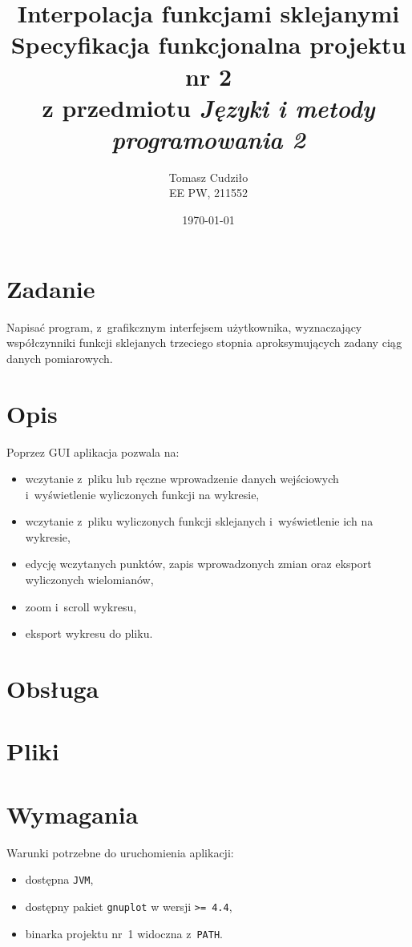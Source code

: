 \documentclass[10pt,a4paper]{article}
\newcommand{\prog}[1]{\texttt{#1}}
\begin{document}
\title{ 
  Interpolacja funkcjami sklejanymi\\
  {\normalsize Specyfikacja funkcjonalna projektu nr 2}\\\vspace{-12pt}
  {\normalsize z przedmiotu \emph{Języki i metody programowania 2}}
}
\author{
  Tomasz Cudziło\\
  {\small EE PW, 211552}
}
\date{\today}
\maketitle

\section*{Zadanie}
\label{sec:zadanie}

Napisać program, z~grafikcznym interfejsem użytkownika, wyznaczający
współczynniki funkcji sklejanych trzeciego stopnia aproksymujących zadany ciąg
danych pomiarowych.

\vspace{24pt}

\section{Opis}
\label{sec:opis}

Poprzez GUI aplikacja pozwala na:
\begin{itemize}
  \item wczytanie z~pliku lub ręczne wprowadzenie danych wejściowych
    i~wyświetlenie wyliczonych funkcji na wykresie,
  \item wczytanie z~pliku wyliczonych funkcji sklejanych i~wyświetlenie ich na
    wykresie,
  \item edycję wczytanych punktów, zapis wprowadzonych zmian oraz eksport
    wyliczonych wielomianów,
  \item zoom i~scroll wykresu,
  \item eksport wykresu do pliku.
\end{itemize}

\section{Obsługa}
\label{sec:obsluga}

\section{Pliki}
\label{sec:pliki}

\section{Wymagania}
\label{sec:wymagania}

Warunki potrzebne do uruchomienia aplikacji:
\begin{itemize}
  \item dostępna \prog{JVM},
  \item dostępny pakiet \prog{gnuplot} w wersji \prog{>= 4.4},
  \item binarka projektu nr~1 widoczna z~\prog{PATH}.
\end{itemize}
\end{document}
